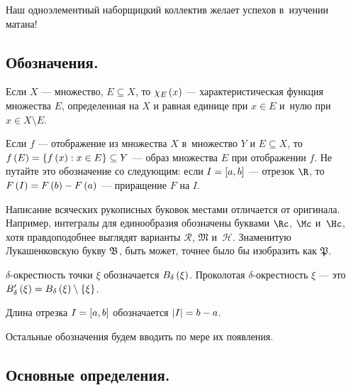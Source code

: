 \documentclass[draft]{article}
\begin{document}
\medskip

Наш одноэлементный наборщицкий коллектив желает успехов в~изучении
матана!

\medskip
\dmvntrail

\bigskip



\subsection{Обозначения.}

\bigskip

Если $X$ --- множество, $E\subseteq X$, то $\chi_E\atx$ ---
характеристическая функция множества $E$, определенная на $X$ и
равная единице при $x\in E$ и~нулю при $x\in X\setminus E$.

\medskip

Если $f$ --- отображение из множества $X$ в~множество $Y$ и
$E\subseteq X$, то $f\at(E)=\set{f\atx: x\in E}\subseteq Y$ ---
образ множества $E$ при отображении $f$. Не путайте это обозначение
со следующим: если $I=\segab$ --- отрезок $\R$, то
$F\at(I)=F\at(b)-F\at(a)$ --- приращение $F$ на $I$.

\medskip

Написание всяческих рукописных буковок местами отличается от
оригинала. Например, интегралы для единообразия обозначены буквами
$\rimanletter$, $\macshletter$ и~$\kurzhletter$, хотя правдоподобнее
выглядят варианты $\mathscr{R}$, $\mathfrak{M}$ и~$\mathscr{H}$.
Знаменитую Лукашенковскую букву $\mathfrak{B}$, быть может, точнее было бы
изобразить как $\mathfrak{P}$.

\medskip

$\delta$-окрестность точки $\xi$ обозначается $B_{\delta}\at(\xi)$.
Проколотая $\delta$-окрестность $\xi$ --- это
$B'_{\delta}\at(\xi)=B_{\delta}\at(\xi)\setminus\set{\xi}$.

\medskip

Длина отрезка $I=\segab$ обозначается $\left|I\right|=b-a$.

\medskip

Остальные обозначения будем вводить по мере их появления.

\eject

\tableofcontents

\eject




\subsection{Основные определения.}
\end{document}
